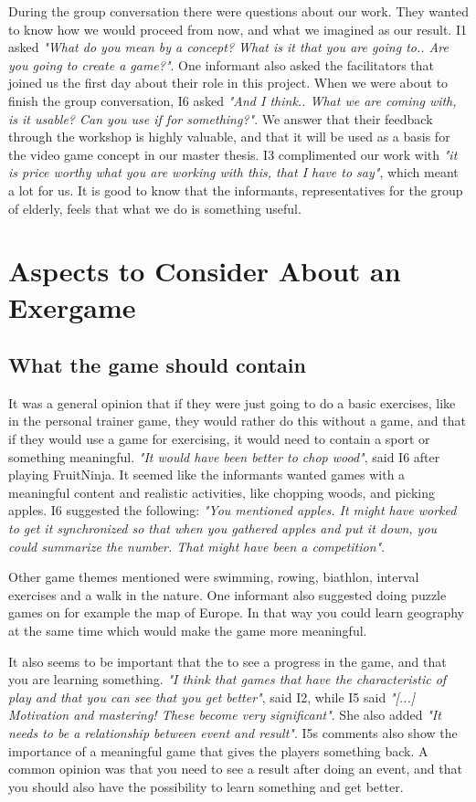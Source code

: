 During the group conversation there were questions about our work. They wanted to know how we would proceed from now, and what we imagined as our result. I1 asked \emph{"What do you mean by a concept? What is it that you are going to.. Are you going to create a game?"}. One informant also asked the facilitators that joined us the first day about their role in this project. When we were about to finish the group conversation, I6 asked \emph{"And I think.. What we are coming with, is it usable? Can you use if for something?"}. We answer that their feedback through the workshop is highly valuable, and that it will be used as a basis for the video game concept in our master thesis. I3 complimented our work with \emph{"it is price worthy what you are working with this, that I have to say"}, which meant a lot for us. It is good to know that the informants, representatives for the group of elderly, feels that what we do is something useful.  

\section{Aspects to Consider About an Exergame}
\subsection{What the game should contain}

It was a general opinion that if they were just going to do a basic exercises, like in the personal trainer game, they would rather do this without a game, and that if they would use a game for exercising, it would need to contain a sport or something meaningful. \emph{"It would have been better to chop wood"}, said I6 after playing FruitNinja. It seemed like the informants wanted games with a meaningful content and realistic activities, like chopping woods, and picking apples. I6 suggested the following: \emph{"You mentioned apples. It might have worked to get it synchronized so that when you gathered apples and put it down, you could summarize the number. That might have been a competition"}.

Other game themes mentioned were swimming, rowing, biathlon, interval exercises and a walk in the nature. One informant also suggested doing puzzle games on for example the map of Europe. In that way you could learn geography at the same time which would make the game more meaningful.

It also seems to be important that the to see a progress in the game, and that you are learning something. \emph{"I think that games that have the characteristic of play and that you can see that you get better"}, said I2, while I5 said \emph{"[...] Motivation and mastering! These become very significant"}. She also added \emph{"It needs to be a relationship between event and result"}. I5s comments also show the importance of a meaningful game that gives the players something back. A common opinion was that you need to see a result after doing an event, and that you should also have the possibility to learn something and get better. 


